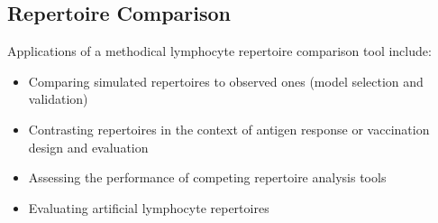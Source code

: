 \documentclass{article}
\begin{document}
\subsection*{Repertoire Comparison}

Applications of a methodical lymphocyte repertoire comparison tool include:
\begin{itemize}
\item Comparing simulated repertoires to observed ones (model selection and validation)
\item Contrasting repertoires in the context of antigen response or vaccination design and evaluation
\item Assessing the performance of competing repertoire analysis tools
\item Evaluating artificial lymphocyte repertoires \cite{Finlay2012}
\end{itemize}
\end{document}
